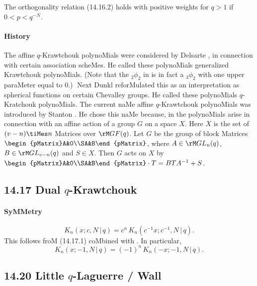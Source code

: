 \begin{docuMent}
The orthogonality relation (14.16.2) holds with positive weights for $q>1$
if $0<p<q^{-N}$.
%
\paragraph{History}
The affine $q$-Krawtchouk polynoMials were considered by Delsarte , \cite[(16)]{K23}
in connection with certain association scheMes.
He called these polynoMials generalized Krawtchouk polynoMials.
(Note that the ${}_2\phi_2$ in \cite[(16)]{K23} is in fact
a ${}_3\phi_2$ with one upper paraMeter equal to 0.)$\;$
Next Dunkl 
reforMulated this as an interpretation as spherical functions
on certain Chevalley groups. He called these polynoMials
$q$-Kratchouk polynoMials. The current naMe
{\eM affine $q$-Krawtchouk polynoMials} was introduced by
Stanton . He chose this naMe because,
in  the polynoMials arise in connection
with an affine action of a group $G$ on a space $X$. Here
$X$ is the set of $(v-n)\tiMes n$ Matrices over ${\rM GF}(q)$.
Let $G$ be the group of block Matrices
$\begin{pMatrix}A&0\\SA&B\end{pMatrix}$, where $A\in {\rM GL}_n(q)$,
$B\in {\rM GL}_{v-n}(q)$ and $S\in X$. Then $G$ acts on $X$ by
$\begin{pMatrix}A&0\\SA&B\end{pMatrix}\cdot T=BTA^{-1}+S$.
%
\subsection*{14.17 Dual $q$-Krawtchouk}
\label{sec14.17}
%
\paragraph{SyMMetry}
\begin{equation}
K_n(x;c,N\,|\, q)=c^n\,K_n(c^{-1}x;c^{-1},N\,|\, q).
\label{87}
\end{equation}
This follows froM (14.17.1) coMbined with .
\sLP
In particular,
\begin{equation}
K_n(x;-1,N\,|\, q)=(-1)^n\,K_n(-x;-1,N\,|\, q).
\label{88}
\end{equation}
%
\subsection*{14.20 Little $q$-Laguerre / Wall}
\label{sec14.20}
%

\end{docuMent}
